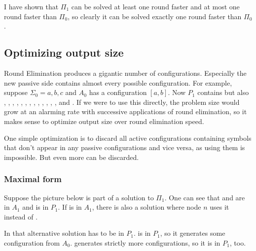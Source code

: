 \documentclass[english, 12pt, a4paper, sci, a-1b, online]{aaltothesis}
\begin{document}
I have shown that $\Pi_1$ can be solved at least one round faster and at most one round faster than $\Pi_0$, so clearly it can be solved exactly one round faster than $\Pi_0$.

\subsection{Optimizing output size}

Round Elimination produces a gigantic number of configurations. Especially the new passive side contains almost every possible configuration. For example, suppose $\Sigma_{0} = {a, b, c}$ and $A_0$ has a configuration $[a, b]$. Now $P_{1}$ contains  but also , , , , , , , , , , , , ,  and . If we were to use this directly, the problem size would grow at an alarming rate with successive applications of round elimination, so it makes sense to optimize output size over round elimination speed.

One simple optimization is to discard all active configurations containing symbols that don't appear in any passive configurations and vice versa, as using them is impossible. But even more can be discarded.

\subsubsection{Maximal form}

Suppose the picture below is part of a solution to $\Pi_{1}$. One can see that  and  are in $A_{1}$ and  is in $P_{1}$. If  is in $A_{1}$, there is also a solution where node $n$ uses it instead of .


In that alternative solution  has to be in $P_{1}$.  is in $P_{1}$, so it generates some configuration from $A_{0}$.  generates strictly more configurations, so it is in $P_{1}$, too.
\end{document}
